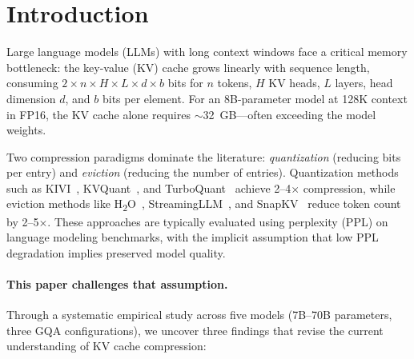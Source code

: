 \section{Introduction}
\label{sec:intro}

Large language models (LLMs) with long context windows face a critical memory bottleneck: the key-value (KV) cache grows linearly with sequence length, consuming $2 \times n \times H \times L \times d \times b$ bits for $n$ tokens, $H$ KV heads, $L$ layers, head dimension $d$, and $b$ bits per element.
For an 8B-parameter model at 128K context in FP16, the KV cache alone requires $\sim$32~GB---often exceeding the model weights.

Two compression paradigms dominate the literature: \emph{quantization} (reducing bits per entry) and \emph{eviction} (reducing the number of entries). Quantization methods such as KIVI~\citep{kivi2024}, KVQuant~\citep{kvquant2024}, and TurboQuant~\citep{turboquant2026} achieve 2--4$\times$ compression, while eviction methods like H\textsubscript{2}O~\citep{h2o2023}, StreamingLLM~\citep{streamingllm2024}, and SnapKV~\citep{snapkv2024} reduce token count by 2--5$\times$. These approaches are typically evaluated using perplexity (PPL) on language modeling benchmarks, with the implicit assumption that low PPL degradation implies preserved model quality.

\paragraph{This paper challenges that assumption.} Through a systematic empirical study across five models (7B--70B parameters, three GQA configurations), we uncover three findings that revise the current understanding of KV cache compression:

